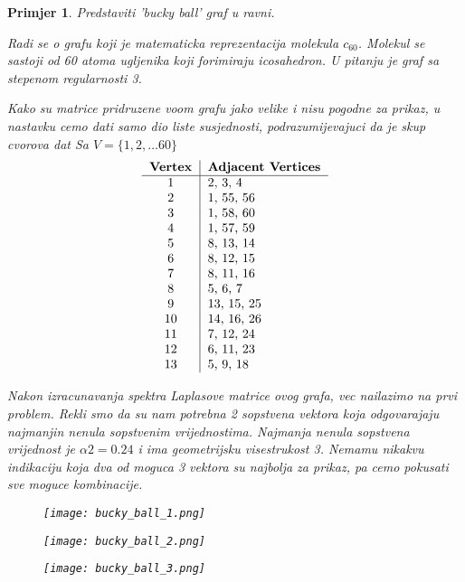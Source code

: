 \documentclass[11pt]{article}
\newtheorem{example}{Primjer}
\begin{document}
    \begin{example}
        Predstaviti 'bucky ball' graf u ravni. 
        
        Radi se o grafu koji je matematicka reprezentacija molekula $c_{60}$. Molekul se sastoji od 60 atoma ugljenika koji forimiraju icosahedron.
        U pitanju je graf sa stepenom regularnosti 3.
        
        Kako su matrice pridruzene voom grafu jako velike i nisu pogodne za prikaz, u nastavku cemo dati samo dio liste susjednosti, podrazumijevajuci da je skup cvorova dat Sa
        $V = \{1,2, \dots 60\}$
        \[
            \begin{tabular}{c|l}
                \textbf{Vertex} & \textbf{Adjacent Vertices} \\
                \hline
                1 & 2, 3, 4 \\
                2 & 1, 55, 56 \\
                3 & 1, 58, 60 \\
                4 & 1, 57, 59 \\
                5 & 8, 13, 14 \\
                6 & 8, 12, 15 \\
                7 & 8, 11, 16 \\
                8 & 5, 6, 7 \\
                9 & 13, 15, 25 \\
                10 & 14, 16, 26 \\
                11 & 7, 12, 24 \\
                12 & 6, 11, 23 \\
                13 & 5, 9, 18 \\
        \end{tabular}
        \]

        Nakon izracunavanja spektra Laplasove matrice ovog grafa, vec nailazimo na prvi problem. Rekli smo da su nam potrebna 2 sopstvena vektora koja odgovarajaju najmanjin nenula sopstvenim 
        vrijednostima. Najmanja nenula sopstvena vrijednost je $\alpha2 = 0.24$ i ima geometrijsku visestrukost 3. Nemamu nikakvu indikaciju koja dva od moguca 3 vektora su najbolja za prikaz, pa cemo pokusati sve moguce kombinacije.

        \begin{figure}[h]
            \centering
            \texttt{[image: bucky\_ball\_1.png]}
        \end{figure}
        \begin{figure}[h]
            \centering
            \texttt{[image: bucky\_ball\_2.png]}
        \end{figure}
        \begin{figure}[h]
            \centering
            \texttt{[image: bucky\_ball\_3.png]}
        \end{figure}


\end{example}
\end{document}
